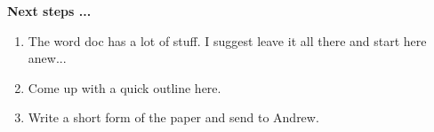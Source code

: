 \documentclass[11pt,letter]{article}
\begin{document}


{\bf Next steps ...}
\begin{enumerate}
\item The word doc has a lot of stuff. I suggest leave it all there and start here anew...
\item Come up with a quick outline here.
\item Write a short form of the paper and send to Andrew. 
\end{enumerate}
\end{document}
